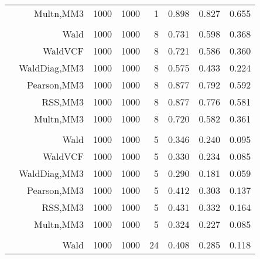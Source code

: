 \documentclass[
]{article}
\begin{document}
\begin{table}[H]
{\begin{tabular}[t]{lrrrrrrr}
\hspace{1em} & Multn,MM3 & 1000 & 1000 & 1 & 0.898 & 0.827 & 0.655\\
\cmidrule{1-8}
\addlinespace[0.3em]
\multicolumn{8}{l}{\textbf{1F 15V}}\\
\hspace{1em} & Wald & 1000 & 1000 & 8 & 0.731 & 0.598 & 0.368\\

\hspace{1em} & WaldVCF & 1000 & 1000 & 8 & 0.721 & 0.586 & 0.360\\

\hspace{1em} & WaldDiag,MM3 & 1000 & 1000 & 8 & 0.575 & 0.433 & 0.224\\

\hspace{1em} & Pearson,MM3 & 1000 & 1000 & 8 & 0.877 & 0.792 & 0.592\\

\hspace{1em} & RSS,MM3 & 1000 & 1000 & 8 & 0.877 & 0.776 & 0.581\\

\hspace{1em} & Multn,MM3 & 1000 & 1000 & 8 & 0.720 & 0.582 & 0.361\\
\cmidrule{1-8}
\addlinespace[0.3em]
\multicolumn{8}{l}{\textbf{2F 10V}}\\
\hspace{1em} & Wald & 1000 & 1000 & 5 & 0.346 & 0.240 & 0.095\\

\hspace{1em} & WaldVCF & 1000 & 1000 & 5 & 0.330 & 0.234 & 0.085\\

\hspace{1em} & WaldDiag,MM3 & 1000 & 1000 & 5 & 0.290 & 0.181 & 0.059\\

\hspace{1em} & Pearson,MM3 & 1000 & 1000 & 5 & 0.412 & 0.303 & 0.137\\

\hspace{1em} & RSS,MM3 & 1000 & 1000 & 5 & 0.431 & 0.332 & 0.164\\

\hspace{1em} & Multn,MM3 & 1000 & 1000 & 5 & 0.324 & 0.227 & 0.085\\
\cmidrule{1-8}
\addlinespace[0.3em]
\multicolumn{8}{l}{\textbf{3F 15V}}\\
\hspace{1em} & Wald & 1000 & 1000 & 24 & 0.408 & 0.285 & 0.118\\


\end{tabular}}
\end{table}
\end{document}
